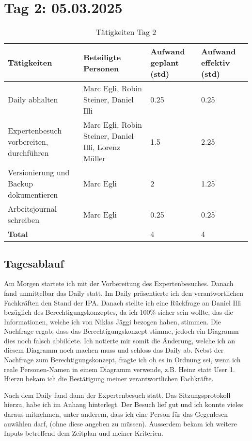 \section{Tag 2: 05.03.2025}
\begin{table}[H]
    \begin{tabular}{|L{0.4\textwidth}|C{60pt}|C{60pt}|C{60pt}|}
        \hline
        \color{white}Tätigkeiten & \color{white}Beteiligte \color{white}Personen & \color{white}Aufwand geplant (std) & \color{white}Aufwand effektiv (std) \\
         \hline
         Daily abhalten & Marc Egli, Robin Steiner, Daniel Illi & 0.25 & 0.25 \\
         \hline
         Expertenbesuch vorbereiten, durchführen & Marc Egli, Robin Steiner, Daniel Illi, Lorenz Müller & 1.5 & 2.25 \\
         \hline
         Versionierung und Backup dokumentieren & Marc Egli & 2 & 1.25 \\
         \hline
         Arbeitsjournal schreiben & Marc Egli & 0.25 & 0.25 \\
        \hline
        \textbf{Total} &  & 4 & 4 \\
        \hline
    \end{tabular}
    \caption{Tätigkeiten Tag 2}
\end{table}

\subsection*{Tagesablauf}
Am Morgen startete ich mit der Vorbereitung des Expertenbesuches. Danach fand unmittelbar das Daily statt.
Im Daily präsentierte ich den verantwortlichen Fachkräften den Stand der IPA. Danach stellte ich eine Rückfrage an Daniel Illi bezüglich des Berechtigungskonzeptes, da
ich 100\% sicher sein wollte, das die Informationen, welche ich von Niklas Jäggi bezogen haben, stimmen. Die Nachfrage ergab, dass das Berechtigungskonzept stimme, jedoch ein Diagramm
dies noch falsch abbildete. Ich notierte mir somit die Änderung, welche ich an diesem Diagramm noch machen muss und schloss das Daily ab.
Nebst der Nachfrage zum Berechtigungskonzept, fragte ich ob es in Ordnung sei, wenn ich reale Personen-Namen in einem Diagramm verwende, z.B. Heinz
statt User 1. Hierzu bekam ich die Bestätigung meiner verantwortlichen Fachkräfte.

Nach dem Daily fand dann der Expertenbesuch statt. Das Sitzungsprotokoll hierzu, habe ich im Anhang hinterlegt. Der Besuch lief gut und ich konnte vieles daraus mitnehmen,
unter anderem, dass ich eine Person für das Gegenlesen auwählen darf, (ohne diese angeben zu müssen). Ausserdem bekam ich weitere Inputs betreffend dem Zeitplan und meiner Kriterien.


